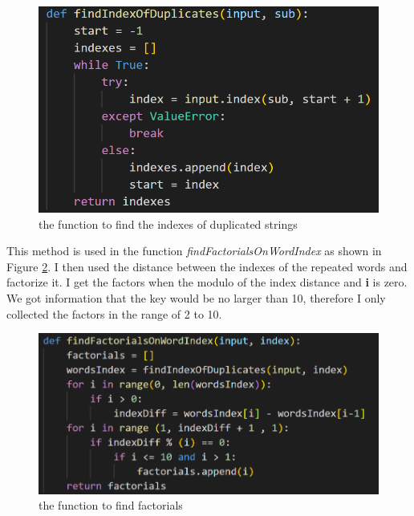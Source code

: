 \documentclass[12pt, letterpaper]{article}
\begin{document}
\begin{figure}[H]
  \includegraphics[width=\linewidth]{code_snippets/findIndexOfDuplicates.PNG}
  \caption{the function to find the indexes of duplicated strings}
  \label{fig:findIndexOfDuplicates}
\end{figure}

This method is used in the function \textit{findFactorialsOnWordIndex} as shown in Figure \ref{fig:findFactorialsOnWordIndex}. I then used the distance between the indexes of the repeated words and factorize it. I get the factors when the modulo of the index distance and \textbf{i} is zero. We got information that the key would be no larger than 10, therefore I only collected the factors in the range of 2 to 10.

\begin{figure}[H]
  \includegraphics[width=\linewidth]{code_snippets/findFactorialsOnWordIndex.PNG}
  \caption{the function to find factorials}
  \label{fig:findFactorialsOnWordIndex}
\end{figure}
\end{document}
